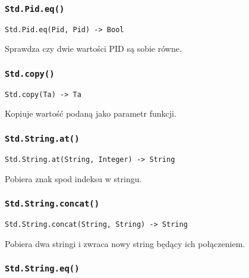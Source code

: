 \subsubsection{\texttt{Std.Pid.eq()}}

\begin{small}
\begin{lstlisting}
Std.Pid.eq(Pid, Pid) -> Bool
\end{lstlisting}
\end{small}

Sprawdza czy dwie wartości PID są sobie równe.

\subsubsection{\texttt{Std.copy()}}

\begin{small}
\begin{lstlisting}
Std.copy(Ta) -> Ta
\end{lstlisting}
\end{small}

Kopiuje wartość podaną jako parametr funkcji.

\subsubsection{\texttt{Std.String.at()}}

\begin{small}
\begin{lstlisting}
Std.String.at(String, Integer) -> String
\end{lstlisting}
\end{small}

Pobiera znak spod indeksu w stringu.

\subsubsection{\texttt{Std.String.concat()}}

\begin{small}
\begin{lstlisting}
Std.String.concat(String, String) -> String
\end{lstlisting}
\end{small}

Pobiera dwa stringi i zwraca nowy string będący ich połączeniem.

\subsubsection{\texttt{Std.String.eq()}}

